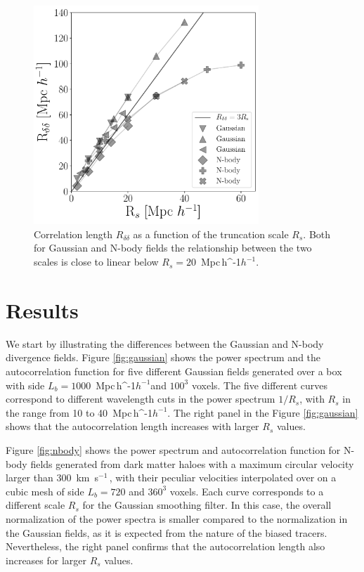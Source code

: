 \documentclass[usenatbib]{mnras}
\newcommand{\Mpch}{\,{\rm Mpc}\,\ifmmode h^{-1}\else $h^{-1}$\fi}
\newcommand{\kms}{\,{\rm km}\ s$^{-1}$\,}
\begin{document}
\begin{figure}
    \centering
    \includegraphics[width=240pt]{correlation_length.pdf}
    \caption{Correlation length $R_{\delta\delta}$ as a function of the truncation scale $R_s$.
    Both for Gaussian and N-body fields the relationship between the two scales is close to linear below $R_{s}=20$ \Mpch.}
    \label{fig:correlation length}
\end{figure}

\section{Results}
\label{sec:results}

We start by illustrating the differences between the Gaussian and N-body divergence fields.
Figure \ref{fig:gaussian} shows the power spectrum and the autocorrelation function for five different Gaussian fields generated over a box with side $L_b=1000$ \Mpch and $100^3$ voxels.
The five different curves correspond to different wavelength cuts in the power spectrum  $1/R_s$, with $R_s$ in the range from 10 to 40 \Mpch.
The right panel in the Figure \ref{fig:gaussian} shows that the autocorrelation length increases with larger $R_{s}$ values.

Figure \ref{fig:nbody} shows the power spectrum and autocorrelation function for N-body fields generated 
from dark matter haloes with a maximum circular velocity larger than $300$ \kms, with their peculiar velocities interpolated over on a cubic mesh of side $L_b=720$ \hMpc and  $360^3$ voxels.
Each curve corresponds to a different scale $R_s$ for the Gaussian smoothing filter.
In this case, the overall normalization of the power spectra is smaller compared to the normalization in the Gaussian fields, as it is expected from the nature of the biased tracers.
Nevertheless, the right panel confirms that the autocorrelation length also increases for larger $R_{s}$ values.
\end{document}
